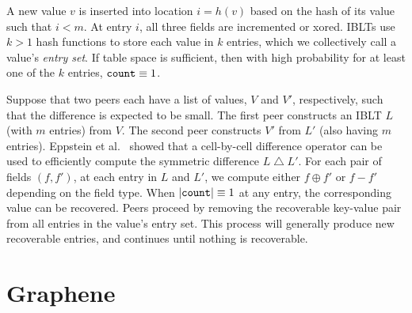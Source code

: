   A new value $v$ is inserted into location $i=h(v)$ based on
the hash of its value such that $i < m$.  At entry $i$, all three
fields are incremented or xored.  
  IBLTs use $k > 1$ hash
functions to store each value in $k$ entries, which we collectively call a value's \emph{entry set}.  
If table space is sufficient, then with high probability for at least one of the $k$
entries, $\mbox{\texttt{count}} \equiv 1$.

Suppose that two peers each have a list of values, $V$ and $V'$,
respectively, such that the difference is expected to be small.  The
first peer constructs an IBLT $L$ (with $m$ entries) from $V$.  The
second peer constructs $V'$ from $L'$ (also having $m$ entries).
Eppstein et al.~\cite{eppstein:2011} showed that a cell-by-cell
difference operator can be used to efficiently compute the symmetric
difference $L \bigtriangleup L'$.  For each pair of fields $(f, f')$,
at each entry in $L$ and $L'$, we compute either $f \oplus f'$ or
\mbox{$f - f'$} depending on the field type.  When
$|\mbox{\texttt{count}}| \equiv 1$ at any entry, the corresponding
value can be recovered.  
  Peers proceed by removing the recoverable key-value pair from all entries in the value's entry set.
This process will generally produce new recoverable entries, and
continues until nothing is recoverable.
 
\section{Graphene}

